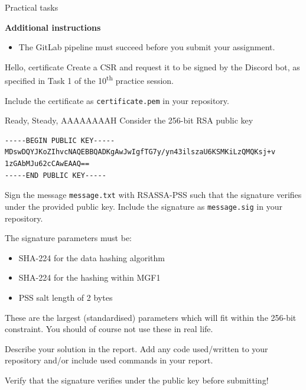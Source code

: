 \documentclass{homework}
\begin{document}
\newpage
\setcounter{task}{0}

\begin{center}
  Practical tasks
\end{center}

\textbf{Additional instructions}

\begin{itemize}
  \item The GitLab pipeline must succeed before you submit your assignment.
\end{itemize}

\begin{task}{Hello, certificate}
  Create a CSR and request it to be signed by the Discord bot, as specified in Task 1 of the 10\textsuperscript{th} practice session.

  Include the certificate as \texttt{certificate.pem} in your repository.
\end{task}

\begin{task}{Ready, Steady, AAAAAAAAH}
  Consider the 256-bit RSA public key
  \begin{Verbatim}
-----BEGIN PUBLIC KEY-----
MDswDQYJKoZIhvcNAQEBBQADKgAwJwIgfTG7y/yn43ilszaU6KSMKiLzQMQKsj+v
1zGAbMJu62cCAwEAAQ==
-----END PUBLIC KEY-----
  \end{Verbatim}

  Sign the message \texttt{message.txt} with RSASSA-PSS such that the signature verifies under the provided public key.
  Include the signature as \texttt{message.sig} in your repository.
  
  The signature parameters must be:
  \begin{itemize}
    \item SHA-224 for the data hashing algorithm
    \item SHA-224 for the hashing within MGF1
    \item PSS salt length of 2 bytes
  \end{itemize}

  These are the largest (standardised) parameters which will fit within the 256-bit constraint.
  You should of course not use these in real life.

  Describe your solution in the report.
  Add any code used/written to your repository and/or include used commands in your report.

  Verify that the signature verifies under the public key before submitting!
\end{task}
\end{document}
